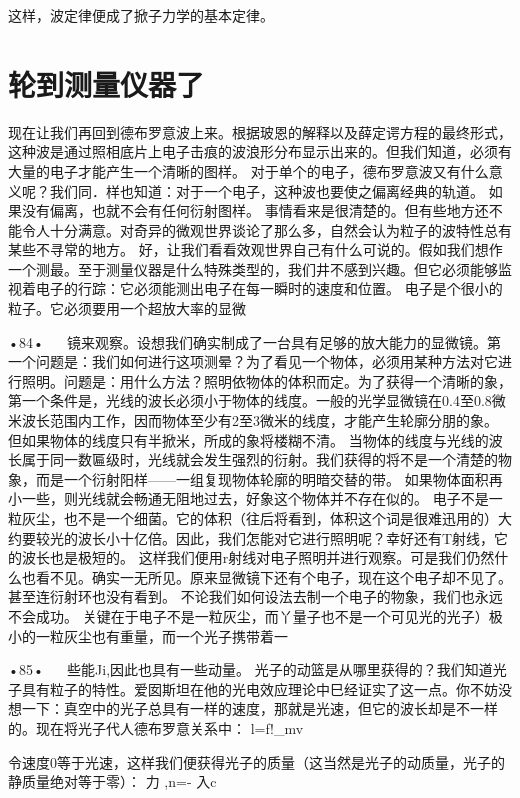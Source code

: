 这样，波定律便成了掀子力学的基本定律。

\section{轮到测量仪器了}

现在让我们再回到德布罗意波上来。根据玻恩的解释以及薛定谔方程的最终形式，这种波是通过照相底片上电子击痕的波浪形分布显示出来的。但我们知道，必须有大量的电子才能产生一个清晰的图样。
对于单个的电子，德布罗意波又有什么意义呢？我们同．样也知道：对于一个电子，这种波也要使之偏离经典的轨道。
如果没有偏离，也就不会有任何衍射图样。
事情看来是很清楚的。但有些地方还不能令人十分满意。对奇异的微观世界谈论了那么多，自然会认为粒子的波特性总有某些不寻常的地方。
好，让我们看看效观世界自己有什么可说的。假如我们想作一个测最。至于测量仪器是什么特殊类型的，我们井不感到兴趣。但它必须能够监视着电子的行踪：它必须能测出电子在每一瞬时的速度和位置。
电子是个很小的粒子。它必须要用一个超放大率的显微

•84•
  
镜来观察。设想我们确实制成了一台具有足够的放大能力的显微镜。第一个问题是：我们如何进行这项测晕？为了看见一个物体，必须用某种方法对它进行照明。问题是：用什么方法？照明依物体的体积而定。为了获得一个清晰的象，第一个条件是，光线的波长必须小于物体的线度。一般的光学显微镜在0.4至0.8微米波长范围内工作，因而物体至少有2至3微米的线度，才能产生轮廓分朋的象。
但如果物体的线度只有半掀米，所成的象将楼糊不清。
当物体的线度与光线的波长属于同一数匾级时，光线就会发生强烈的衍射。我们获得的将不是一个清楚的物象，而是一个衍射阳样——一组复现物体轮廓的明暗交替的带。
如果物体面积再小一些，则光线就会畅通无阻地过去，好象这个物体并不存在似的。
电子不是一粒灰尘，也不是一个细菌。它的体积（往后将看到，体积这个词是很难迅用的）大约要较光的波长小十亿倍。因此，我们怎能对它进行照明呢？幸好还有T射线，它的波长也是极短的。
这样我们便用r射线对电子照明并进行观察。可是我们仍然什么也看不见。确实一无所见。原来显微镜下还有个电子，现在这个电子却不见了。甚至连衍射环也没有看到。
不论我们如何设法去制一个电子的物象，我们也永远不会成功。
关键在于电子不是一粒灰尘，而丫量子也不是一个可见光的光子）极小的一粒灰尘也有重量，而一个光子携带着一

•85•
  
些能Ji,因此也具有一些动量。
光子的动篮是从哪里获得的？我们知道光子具有粒子的特性。爱囡斯坦在他的光电效应理论中巳经证实了这一点。你不妨没想一下：真空中的光子总具有一样的速度，那就是光速，但它的波长却是不一样的。现在将光子代人德布罗意关系中：
l=f!_mv

令速度0等于光速，这样我们便获得光子的质量（这当然是光子的动质量，光子的静质量绝对等于零）：
力
,n=-
入c

